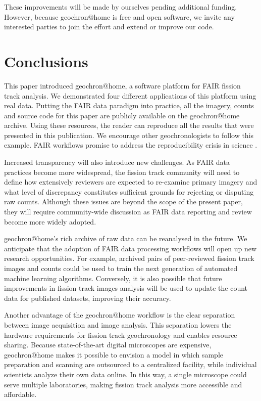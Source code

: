 \documentclass[gchron, manuscript]{copernicus}
\begin{document}
These improvements will be made by ourselves pending additional
funding. However, because geochron@home is free and open software, we
invite any interested parties to join the effort and extend or improve
our code.

\section{Conclusions}\label{sec:conclusions}

This paper introduced geochron@home, a software platform for FAIR
fission track analysis. We demonstrated four different applications of
this platform using real data. Putting the FAIR data paradigm into
practice, all the imagery, counts and source code for this paper are
publicly available on the geochron@home archive. Using these
resources, the reader can reproduce all the results that were
presented in this publication.  We encourage other geochronologists to
follow this example.  FAIR workflows promise to address the
reproducibility crisis in science \citep{miyakawa2020}.\medskip

Increased transparency will also introduce new challenges. As FAIR
data practices become more widespread, the fission track community
will need to define how extensively reviewers are expected to
re-examine primary imagery and what level of discrepancy constitutes
sufficient grounds for rejecting or disputing raw counts. Although
these issues are beyond the scope of the present paper, they will
require community-wide discussion as FAIR data reporting and review
become more widely adopted.\medskip

geochron@home's rich archive of raw data can be reanalysed in
the future. We anticipate that the adoption of FAIR data processing
workflows will open up new research opportunities. For example,
archived pairs of peer-reviewed fission track images and counts could
be used to train the next generation of automated machine learning
algorithms. Conversely, it is also possible that future improvements
in fission track images analysis will be used to update the count data
for published datasets, improving their accuracy.\medskip

Another advantage of the geochron@home workflow is the clear
separation between image acquisition and image analysis. This
separation lowers the hardware requirements for fission track
geochronology and enables resource sharing. Because state-of-the-art
digital microscopes are expensive, geochron@home makes it possible to
envision a model in which sample preparation and scanning are
outsourced to a centralized facility, while individual scientists
analyze their own data online. In this way, a single microscope could
serve multiple laboratories, making fission track analysis more
accessible and affordable.
\medskip
\end{document}
